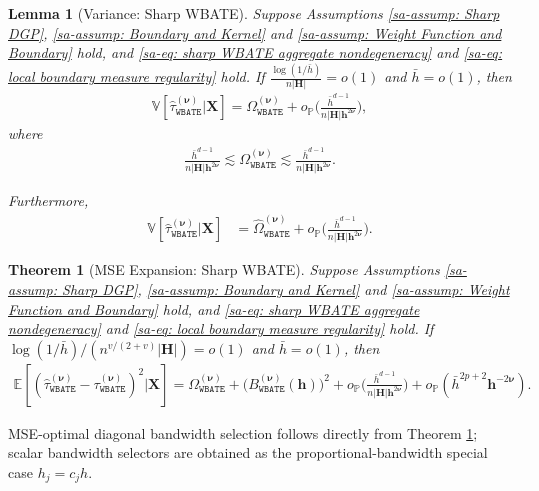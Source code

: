\documentclass[10pt]{article}
\newtheorem{thm}{Theorem}
\newtheorem{lem}{Lemma}
\renewcommand{\P}{\mathbb{P}}
\newcommand{\E}{\mathbb{E}}
\newcommand{\Var}{\mathbb{V}}
\newcommand{\bh}{\mathbf{h}}
\newcommand{\bH}{\mathbf{H}}
\newcommand{\bX}{\mathbf{X}}
\newcommand{\bnu}{\boldsymbol{\nu}}
\begin{document}
\begin{lem}[Variance: Sharp WBATE]\label{sa-lem: Variance: Sharp WBATE}
    Suppose Assumptions \ref{sa-assump: Sharp DGP}, \ref{sa-assump: Boundary and Kernel} and \ref{sa-assump: Weight Function and Boundary} hold, and \eqref{sa-eq: sharp WBATE aggregate nondegeneracy} and \eqref{sa-eq: local boundary measure regularity} hold. If $\frac{\log(1/\bar{h})}{n |\bH|} = o(1)$ and $\bar{h} = o(1)$, then
    \begin{align*}
        \Var[\widehat{\tau}_{\mathtt{WBATE}}^{(\bnu)}|\bX]
        = \Omega_{\mathtt{WBATE}}^{(\bnu)} + o_{\P}\Big(\frac{\bar{h}^{d-1}}{n|\bH|\bh^{2\bnu}}\Big),
    \end{align*}
    where
    \begin{align*}
        \frac{\bar{h}^{d-1}}{n|\bH|\bh^{2\bnu}} \lesssim \Omega_{\mathtt{WBATE}}^{(\bnu)} \lesssim \frac{\bar{h}^{d-1}}{n|\bH|\bh^{2\bnu}}.
    \end{align*}

    Furthermore,
    \begin{align*}
        \Var[\widehat{\tau}_{\mathtt{WBATE}}^{(\bnu)}|\bX] & = \widehat{\Omega}_{\mathtt{WBATE}}^{(\bnu)} + o_{\P}\Big(\frac{\bar{h}^{d-1}}{n|\bH|\bh^{2\bnu}}\Big).
    \end{align*}
\end{lem}

\begin{thm}[MSE Expansion: Sharp WBATE]\label{sa-thm: MSE Expansion: Sharp WBATE}
    Suppose Assumptions \ref{sa-assump: Sharp DGP}, \ref{sa-assump: Boundary and Kernel} and \ref{sa-assump: Weight Function and Boundary} hold, and \eqref{sa-eq: sharp WBATE aggregate nondegeneracy} and \eqref{sa-eq: local boundary measure regularity} hold. If $\log(1/\bar{h})/(n^{v/(2+v)}|\bH|) = o(1)$ and $\bar{h} = o(1)$, then
    \begin{align*}
        \E [(\widehat{\tau}_{\mathtt{WBATE}}^{(\bnu)} - \tau_{\mathtt{WBATE}}^{(\bnu)})^2|\bX]
        = \Omega_{\mathtt{WBATE}}^{(\bnu)} + \big(B_{\mathtt{WBATE}}^{(\bnu)}(\bh)\big)^2
          + o_{\P}\Big(\frac{\bar{h}^{d-1}}{n|\bH|\bh^{2\bnu}}\Big) + o_{\P}(\bar{h}^{2p+2}\bh^{-2\bnu}).
    \end{align*}
\end{thm}

MSE-optimal diagonal bandwidth selection follows directly from Theorem \ref{sa-thm: MSE Expansion: Sharp WBATE}; scalar bandwidth selectors are obtained as the proportional-bandwidth special case $h_j=c_jh$.
\end{document}
